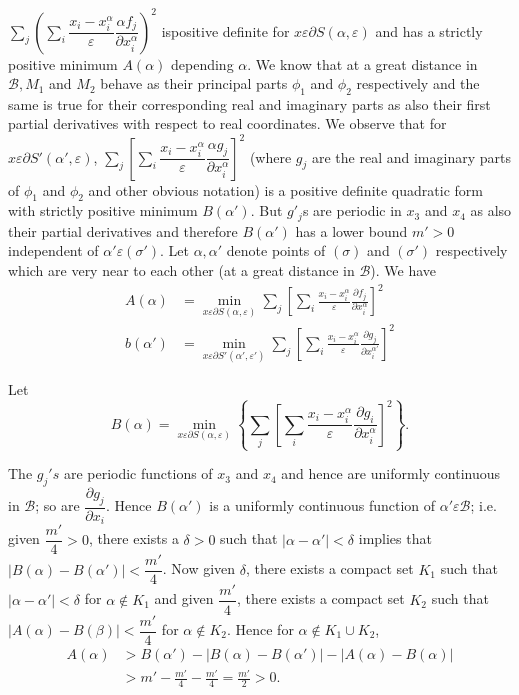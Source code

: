 $\sum_j \left( \sum\limits_{i} \dfrac{x_i - x^\alpha_i}{\varepsilon }
\dfrac{\alpha f_j}{\partial x^\alpha_i}\right)^2$ is\pageoriginale positive definite
for $x \varepsilon  \partial S(\alpha,  \varepsilon )$ and has a strictly positive
minimum $A(\alpha)$ depending $\alpha$. We know that at a great
distance in $\mathscr{B}, M_1$ and $M_2$ behave as their principal
parts $\phi_1$ and $\phi_2$ respectively and the same is true for
their corresponding real and imaginary parts as also their first
partial derivatives with respect to real coordinates. We observe that
for $x \varepsilon  \partial S' (\alpha',  \varepsilon )$, $\sum_j \left[
  \sum\limits_{i} \dfrac{x_i - x^\alpha_i}{\varepsilon } \dfrac{\alpha
    g_j}{\partial x^\alpha_i}\right]^2 $ (where $g_j$ are the real and
imaginary parts of $\phi_1$ and $\phi_2$ and other obvious notation)
is a positive definite quadratic form with strictly positive minimum
$B(\alpha')$. But $g'_j$s are periodic in $x_3$ and $x_4$ as also
their partial derivatives and therefore $B(\alpha')$ has a lower bound
$m' > 0$ independent of $\alpha' \varepsilon  (\sigma')$. Let $\alpha, \alpha'$
denote points of $(\sigma)$ and $(\sigma')$ respectively which are
very near to each other (at a great distance in $\mathscr{B}$). We
have 
\begin{align*}
  A(\alpha) & = \min_{x \varepsilon  \partial S(\alpha,  \varepsilon )} \sum_{j} \left[
    \sum_i \frac{x_i - x^\alpha_i}{\varepsilon } \frac {\partial f_j} {\partial
      x^\alpha_i}\right]^2 \\ 
  b(\alpha') & = \min_{x \varepsilon   \partial S'(\alpha',
    \varepsilon ')} \sum_{j} \left[\sum_i \frac{x_i -
      x^\alpha_i}{\varepsilon } \frac {\partial g_j} {\partial
      x^{\alpha'}_i}\right]^2  
\end{align*}

Let\pageoriginale 
$$
B(\alpha)= \min \limits _{x \varepsilon  \partial S(\alpha, \varepsilon )} \left \{
\sum \limits_j \left [\sum \limits_i \dfrac{x_i-x^ \alpha_i}{\varepsilon }
  \dfrac{\partial g_i}{\partial x^ \alpha_i} \right ]^2 \right \}.
$$ 

The $g_j's$ are periodic functions of $x_3$ and $x_4$ and hence are
uniformly continuous in $\mathscr{B}$; so are $\dfrac{\partial
  g_j}{\partial x_i}$. Hence $B(\alpha ')$ is a uniformly continuous
function of $\alpha' \varepsilon  \mathscr{B}$; i.e. given $\dfrac{m'}{4}>0$,
there exists a $\delta >0$ such that $|\alpha -\alpha '|< \delta$
implies that $|B(\alpha)-B(\alpha ')|< \dfrac{m'}{4}$. Now given
$\delta$, there exists a compact set $K_1$ such that $|\alpha- \alpha
'|< \delta$ for $\alpha \notin K_1$ and given $\dfrac{m'}{4}$, there
exists a compact set $K_2$ such that
$|A(\alpha)-B(\beta)|<\dfrac{m'}{4}$ for $\alpha \notin K_2$. Hence
for $\alpha \notin K_1  \cup K_2$, 
\begin{align*}
  A(\alpha) &> B(\alpha ')-|B(\alpha)-B(\alpha ')|-|A(\alpha)-B(\alpha)|\\
  & > m'-\frac{m'}{4}-\frac{m'}{4}=\frac{m'}{2}>0.
\end{align*}


